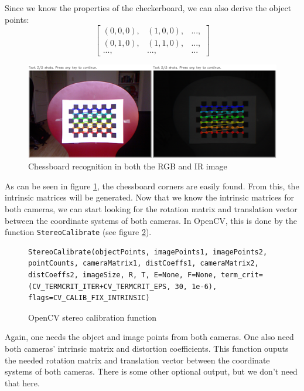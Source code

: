 Since we know the properties of the checkerboard, we can also derive the object
points:
\[
\left[ \begin{array}{ccc}
\left(0, 0, 0\right), & \left(1, 0, 0\right), & ...,\\
\left(0, 1, 0\right), & \left(1, 1, 0\right), & ...,\\
..., & ..., & ...
\end{array}\right]
\]

\begin{figure}[H]
\centering
\includegraphics[scale=0.6]{images/chessboard.png}
\caption{Chessboard recognition in both the RGB and IR image}
\label{fig:chessboard}
\end{figure}

As can be seen in figure \ref{fig:chessboard}, the chessboard corners are easily
found. From this, the intrinsic matrices will be generated. Now that we know the
intrinsic matrices for both cameras, we can start looking for the rotation
matrix and translation vector between the coordinate systems of both cameras. In
OpenCV, this is done by the function \verb|StereoCalibrate| (see figure
\ref{code:stereocalibrate}). 

\begin{figure}[H]
\begin{lstlisting}
StereoCalibrate(objectPoints, imagePoints1, imagePoints2, pointCounts, cameraMatrix1, distCoeffs1, cameraMatrix2, distCoeffs2, imageSize, R, T, E=None, F=None, term_crit=(CV_TERMCRIT_ITER+CV_TERMCRIT_EPS, 30, 1e-6), flags=CV_CALIB_FIX_INTRINSIC)
\end{lstlisting}
\caption{OpenCV stereo calibration function}
\label{code:stereocalibrate}
\end{figure}

Again, one needs the object and image points from both cameras. One also need
both cameras' intrinsic matrix and distortion coefficients. This function ouputs
the needed rotation matrix and translation vector between the coordinate systems
of both cameras. There is some other optional output, but we don't need that
here.

